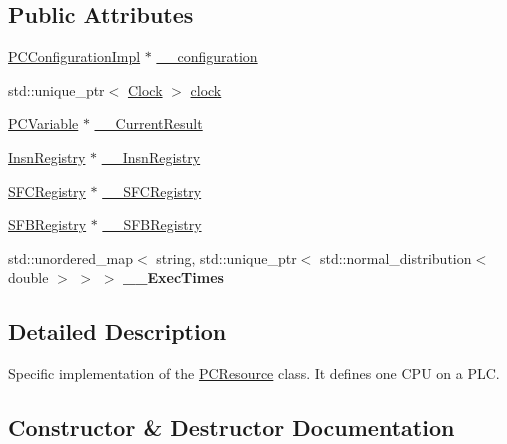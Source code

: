 \subsection*{Public Attributes}
\begin{DoxyCompactItemize}
\item 
\hyperlink{classpc__emulator_1_1PCConfigurationImpl}{P\+C\+Configuration\+Impl} $\ast$ \hyperlink{classpc__emulator_1_1PCResourceImpl_a356a5f4a62005c9aee4f6ef8538ced11}{\+\_\+\+\_\+configuration}
\item 
std\+::unique\+\_\+ptr$<$ \hyperlink{classpc__emulator_1_1Clock}{Clock} $>$ \hyperlink{classpc__emulator_1_1PCResourceImpl_ad49b0d4eb79f506f03f37518e1e70d1e}{clock}
\item 
\hyperlink{classpc__emulator_1_1PCVariable}{P\+C\+Variable} $\ast$ \hyperlink{classpc__emulator_1_1PCResourceImpl_a3648237ffd6fc0c0d569b18f7142154f}{\+\_\+\+\_\+\+Current\+Result}
\item 
\hyperlink{classpc__emulator_1_1InsnRegistry}{Insn\+Registry} $\ast$ \hyperlink{classpc__emulator_1_1PCResourceImpl_ac571faf5e66992a7e32996a613278e91}{\+\_\+\+\_\+\+Insn\+Registry}
\item 
\hyperlink{classpc__emulator_1_1SFCRegistry}{S\+F\+C\+Registry} $\ast$ \hyperlink{classpc__emulator_1_1PCResourceImpl_ab0fadc7735b85b999570f02b8543bdab}{\+\_\+\+\_\+\+S\+F\+C\+Registry}
\item 
\hyperlink{classpc__emulator_1_1SFBRegistry}{S\+F\+B\+Registry} $\ast$ \hyperlink{classpc__emulator_1_1PCResourceImpl_affbb704a7c2800fb84b72409b79c7b54}{\+\_\+\+\_\+\+S\+F\+B\+Registry}
\item 
std\+::unordered\+\_\+map$<$ string, std\+::unique\+\_\+ptr$<$ std\+::normal\+\_\+distribution$<$ double $>$ $>$ $>$ {\bfseries \+\_\+\+\_\+\+Exec\+Times}\hypertarget{classpc__emulator_1_1PCResourceImpl_abcbe484f3c772e73f970107508c00c3b}{}\label{classpc__emulator_1_1PCResourceImpl_abcbe484f3c772e73f970107508c00c3b}

\end{DoxyCompactItemize}


\subsection{Detailed Description}
Specific implementation of the \hyperlink{classpc__emulator_1_1PCResource}{P\+C\+Resource} class. It defines one C\+PU on a P\+LC. 

\subsection{Constructor \& Destructor Documentation}
